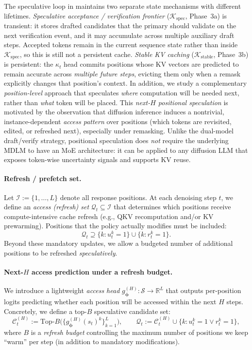 \documentclass[11pt]{article}
\newcommand{\R}{\mathbb{R}}
\newcommand{\cK}{\mathcal{K}}
\newcommand{\cS}{\mathcal{S}}
\newcommand{\cQ}{\mathcal{Q}}
\newcommand{\cC}{\mathcal{C}}
\newcommand{\cI}{\mathcal{I}}
\newcommand{\bphi}{\bm{\phi}}
\begin{document}
The speculative loop in  maintains two separate state mechanisms with different lifetimes.
\emph{Speculative acceptance / verification frontier} ($\cK_{\mathrm{spec}}$, Phase~3a) is transient: it stores drafted candidates that the primary should validate on the next verification event, and it may accumulate across multiple auxiliary draft steps. Accepted tokens remain in the current sequence state rather than inside $\cK_{\mathrm{spec}}$, so this is still not a persistent cache.
\emph{Stable KV caching} ($\cK_{\mathrm{stable}}$, Phase~3b) is persistent: the $\kappa_t$ head commits positions whose KV vectors are predicted to remain accurate across \emph{multiple future steps}, evicting them only when a remask explicitly changes that position's context.
In addition, we study a complementary \emph{position-level} approach that speculates \emph{where} computation will be needed next, rather than \emph{what} token will be placed.
This \emph{next-$H$ positional speculation} is motivated by the observation that diffusion inference induces a nontrivial, instance-dependent \emph{access pattern} over positions (which tokens are revisited, edited, or refreshed next), especially under remasking.
Unlike the dual-model draft/verify strategy, positional speculation does \emph{not} require the underlying MDLM to have an MoE architecture: it can be applied to any diffusion LLM that exposes token-wise uncertainty signals and supports KV reuse.

\paragraph{Refresh / prefetch set.}
Let $\cI := \{1,\dots,L\}$ denote all response positions.
At each denoising step $t$, we define an \emph{access (refresh) set} $\cQ_t \subseteq \cI$ that determines which positions receive compute-intensive cache refresh (e.g., QKV recomputation and/or KV prewarming).
Positions that the policy actually modifies must be included:
\begin{equation}
    \cQ_t \supseteq \{k : u_t^k = 1\} \cup \{k : r_t^k = 1\}.
    \label{eq:Qt_mandatory}
\end{equation}
Beyond these mandatory updates, we allow a budgeted number of additional positions to be refreshed \emph{speculatively}.

\paragraph{Next-$H$ access prediction under a refresh budget.}
We introduce a lightweight \emph{access head} $g_{\bphi}^{(H)}:\cS \to \R^L$ that outputs per-position logits predicting whether each position will be accessed within the next $H$ steps.
Concretely, we define a top-$B$ speculative candidate set:
\begin{equation}
    \cC_t^{(H)} := \text{Top-}B\bigl(\{g_{\bphi}^{(H)}(s_t)^k\}_{k=1}^L\bigr),
    \qquad
    \cQ_t := \cC_t^{(H)} \cup \{k : u_t^k = 1 \lor r_t^k = 1\},
    \label{eq:Qt_candidates}
\end{equation}
where $B$ is a \emph{refresh budget} controlling the maximum number of positions we keep ``warm'' per step (in addition to mandatory modifications).
\end{document}
